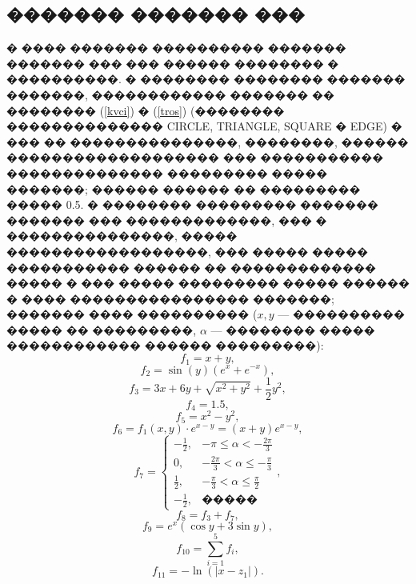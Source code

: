 \documentclass[a4paper]{article}
\begin{document}
\FloatBarrier
\subsection{������� ������� ���}
� ���� ������� ���������� ������� ������� ��� ��� ������ �������� � ����������.
� �������� �������� ������� �������, ������������ ������� �� �������� (\ref{kvci}) � (\ref{tros}) (�������� �������������� CIRCLE, TRIANGLE, SQUARE � EDGE) � ��� �� ���������������, ��������, ������ ������������������� ��� ����������� �������������� ��������� ����� �������; ������ ������ �� ��������� ����� 0.5.
� �������� ��������� ������� ������� ��� �������������, ��� � ���������������, ����� ������������������, ��� ����� ����� ����������� ������ �� ������������� ����� � ��� ����� ��������� ����� ������ � ���� ���������������� �������; ������� ���� ���������� ($x,y$ --- ���������� ����� �� ���������, $\alpha$ --- �������� ����� ������������ ������ ���������):
\begin{equation*}
  f_1=x+y,
\end{equation*}
\begin{equation*}
  f_2=\sin (y) \left(e^x+e^{-x}\right),
\end{equation*}
\begin{equation*}
  f_3=3x+6y+\sqrt{x^2+y^2}+\dfrac{1}{2}y^2,
\end{equation*}
\begin{equation*}
  f_4=1.5,
\end{equation*}
\begin{equation*}
  f_5=x^2-y^2,
\end{equation*}
\begin{equation*}
  f_6=f_1(x,y) \cdot e^{x-y}=(x+y)e^{x-y},
\end{equation*}
\begin{equation*}
  f_7=
  \begin{cases}
    -\frac{1}{2}, & -\pi \leq \alpha < -\frac{2 \pi}{3}           \\
    0,            & -\frac{2 \pi}{3} < \alpha \leq -\frac{\pi}{3} \\
    \frac{1}{2},  & -\frac{\pi}{3} < \alpha \leq \frac{\pi}{2}    \\
    -\frac{1}{2}, & \text{�����}
  \end{cases},
\end{equation*}
\begin{equation*}
  f_8=f_3+f_7,
\end{equation*}
\begin{equation*}
  f_9= e^x( \cos y +3\sin  y),
\end{equation*}
\begin{equation*}
  f_{10}= \sum_{i=1}^{5} f_i,
\end{equation*}
\begin{equation*}
  f_{11}= -\ln (|x-z_1|).
\end{equation*}
\end{document}
